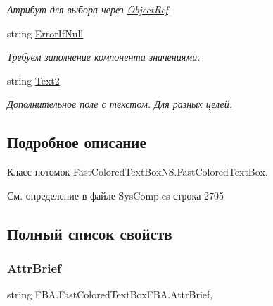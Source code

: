 \begin{DoxyCompactItemize}
\begin{DoxyCompactList}\small\item\em Атрибут для выбора через \mbox{\hyperlink{class_f_b_a_1_1_object_ref}{Object\+Ref}}. ~\newline
\end{DoxyCompactList}\item 
string \mbox{\hyperlink{class_f_b_a_1_1_fast_colored_text_box_f_b_a_a9d059470cd061f3f35e9d676f8158118}{Error\+If\+Null}}
\begin{DoxyCompactList}\small\item\em Требуем заполнение компонента значениями. \end{DoxyCompactList}\item 
string \mbox{\hyperlink{class_f_b_a_1_1_fast_colored_text_box_f_b_a_a9fa5173369751f7587b5626684f9edb7}{Text2}}
\begin{DoxyCompactList}\small\item\em Дополнительное поле с текстом. Для разных целей. \end{DoxyCompactList}\end{DoxyCompactItemize}


\subsection{Подробное описание}
Класс потомок Fast\+Colored\+Text\+Box\+N\+S.\+Fast\+Colored\+Text\+Box. 



См. определение в файле Sys\+Comp.\+cs строка 2705



\subsection{Полный список свойств}
\mbox{\label{class_f_b_a_1_1_fast_colored_text_box_f_b_a_a1f3daca7f46691dbf6fcf16774cd6dbd}} 
\subsubsection{\texorpdfstring{Attr\+Brief}{AttrBrief}}
{\footnotesize\ttfamily string F\+B\+A.\+Fast\+Colored\+Text\+Box\+F\+B\+A.\+Attr\+Brief\hspace{0.3cm}{\ttfamily [get]}, {\ttfamily [set]}}



